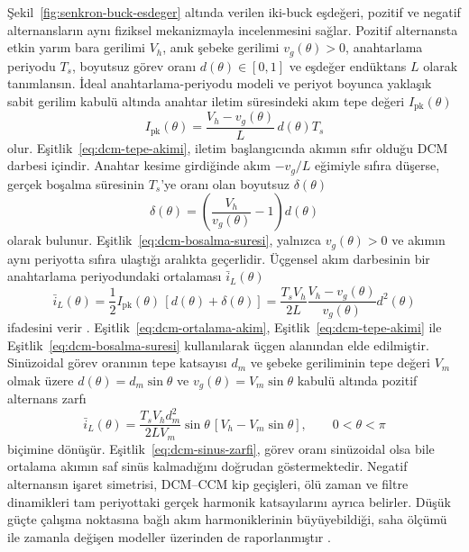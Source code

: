 Şekil~\ref{fig:senkron-buck-esdeger} altında verilen iki-buck eşdeğeri, pozitif ve negatif alternansların aynı fiziksel mekanizmayla incelenmesini sağlar. Pozitif alternansta etkin yarım bara gerilimi $V_h$, anık şebeke gerilimi $v_g(\theta)>0$, anahtarlama periyodu $T_s$, boyutsuz görev oranı $d(\theta)\in[0,1]$ ve eşdeğer endüktans $L$ olarak tanımlansın. İdeal anahtarlama-periyodu modeli ve periyot boyunca yaklaşık sabit gerilim kabulü altında anahtar iletim süresindeki akım tepe değeri $I_{\mathrm{pk}}(\theta)$
\begin{equation}
  I_{\mathrm{pk}}(\theta)=\frac{V_h-v_g(\theta)}{L}\,d(\theta)T_s
  \label{eq:dcm-tepe-akimi}
\end{equation}
olur. Eşitlik~\eqref{eq:dcm-tepe-akimi}, iletim başlangıcında akımın sıfır olduğu DCM darbesi içindir. Anahtar kesime girdiğinde akım $-v_g/L$ eğimiyle sıfıra düşerse, gerçek boşalma süresinin $T_s$'ye oranı olan boyutsuz $\delta(\theta)$
\begin{equation}
  \delta(\theta)=\left(\frac{V_h}{v_g(\theta)}-1\right)d(\theta)
  \label{eq:dcm-bosalma-suresi}
\end{equation}
olarak bulunur. Eşitlik~\eqref{eq:dcm-bosalma-suresi}, yalnızca $v_g(\theta)>0$ ve akımın aynı periyotta sıfıra ulaştığı aralıkta geçerlidir. Üçgensel akım darbesinin bir anahtarlama periyodundaki ortalaması $\bar i_L(\theta)$
\begin{equation}
  \bar i_L(\theta)=\frac{1}{2}I_{\mathrm{pk}}(\theta)\,[d(\theta)+\delta(\theta)]
  =\frac{T_sV_h}{2L}\frac{V_h-v_g(\theta)}{v_g(\theta)}d^2(\theta)
  \label{eq:dcm-ortalama-akim}
\end{equation}
ifadesini verir \citep{Erickson2001,Chen2010}. Eşitlik~\eqref{eq:dcm-ortalama-akim}, Eşitlik~\eqref{eq:dcm-tepe-akimi} ile Eşitlik~\eqref{eq:dcm-bosalma-suresi} kullanılarak üçgen alanından elde edilmiştir. Sinüzoidal görev oranının tepe katsayısı $d_m$ ve şebeke geriliminin tepe değeri $V_m$ olmak üzere $d(\theta)=d_m\sin\theta$ ve $v_g(\theta)=V_m\sin\theta$ kabulü altında pozitif alternans zarfı
\begin{equation}
  \bar i_L(\theta)=\frac{T_sV_hd_m^2}{2LV_m}\sin\theta\,[V_h-V_m\sin\theta],
  \qquad 0<\theta<\pi
  \label{eq:dcm-sinus-zarfi}
\end{equation}
biçimine dönüşür. Eşitlik~\eqref{eq:dcm-sinus-zarfi}, görev oranı sinüzoidal olsa bile ortalama akımın saf sinüs kalmadığını doğrudan göstermektedir. Negatif alternansın işaret simetrisi, DCM--CCM kip geçişleri, ölü zaman ve filtre dinamikleri tam periyottaki gerçek harmonik katsayılarını ayrıca belirler. Düşük güçte çalışma noktasına bağlı akım harmoniklerinin büyüyebildiği, saha ölçümü ile zamanla değişen modeller üzerinden de raporlanmıştır \citep{Chicco2009,Du2013}.

